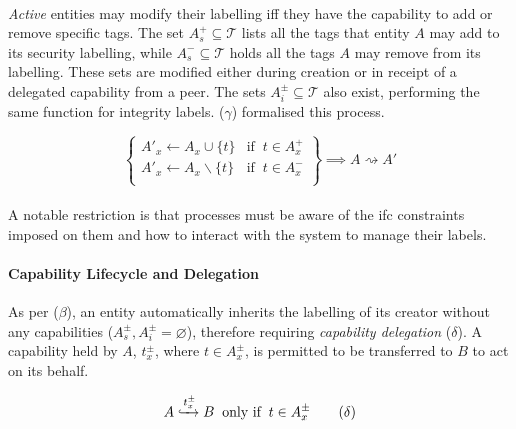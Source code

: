 \paragraph{} \textit{Active} entities may modify their labelling iff they have the capability to add or remove specific tags. The set $A_{s}^{+} \subseteq \mathcal{T}$ lists all the tags that entity $A$ may add to its security labelling, while $A_{s}^{-} \subseteq \mathcal{T}$ holds all the tags $A$ may remove from its labelling. These sets are modified either during creation or in receipt of a delegated capability from a peer. The sets $A_{i}^{\pm} \subseteq \mathcal{T}$ also exist, performing the same function for integrity labels. ($\gamma$) formalised this process.


\begin{equation}
    \left\{\begin{array}{lr}
        A'_x \leftarrow A_x \cup \{t\} & \text{if} \;\; t \in A_{x}^{+} \\
        A'_x \leftarrow A_x \smallsetminus \{t\} & \text{if} \;\; t \in A_{x}^{-} \\
    \end{array}\right\} \implies A \rightsquigarrow A' \tag{$\gamma$}
\end{equation}

\paragraph{} A notable restriction is that processes must be aware of the \acrshort{ifc} constraints imposed on them and how to interact with the system to manage their labels.

\paragraph{Capability Lifecycle and Delegation} As per ($\beta$), an entity automatically inherits the labelling of its creator without any capabilities ($A_{s}^{\pm}, A_{i}^{\pm} = \varnothing$), therefore requiring \textit{capability delegation} ($\delta$). A capability held by $A$, $t_{x}^{\pm}$, where $t \in A_{x}^{\pm}$, is permitted to be transferred to $B$ to act on its behalf.

\vspace{-3mm}
\begin{equation}
    A \xhookrightarrow[]{t^{\pm}_{x}} B \;\; \text{only if} \;\; t \in A_{x}^{\pm} \tag{$\delta$}
\end{equation}

